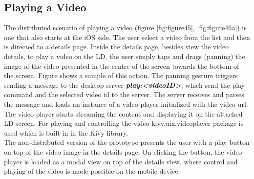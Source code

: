 \subsection{Playing a Video}
The distributed scenario of playing a video (figure \ref{fig:figure45}, \ref{fig:figure46a}) is one that also starts at the iOS side. The user select a video from the list and then is directed to a details page. Inside the details page, besides view the video details, to play a video on the LD, the user simply taps and drags (panning) the image of the video presented in the centre of the screen towards the bottom of the screen. Figure shows a sample of this action. The panning gesture triggers sending a message to the desktop server \textbf{\textit{play:<videoID>}}, which send the play command and the selected video id to the server. The server receives and parses the message and loads an instance of a video player initialized with the video url. The video player starts streaming the content and displaying it on the attached LD screen. For playing and controlling the video kivy.uix.videoplayer package is used which is built-in in the Kivy library.\\ 
The non-distributed version of the prototype presents the user with a play button on top of the video image in the details page. On clicking the button, the video player is loaded as a modal view on top of the details view, where control and playing of the video is made possible on the mobile device. 
 
